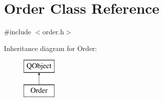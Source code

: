 \hypertarget{class_order}{}\section{Order Class Reference}
\label{class_order}


{\ttfamily \#include $<$order.\+h$>$}

Inheritance diagram for Order\+:\begin{figure}[H]
\begin{center}
\leavevmode
\includegraphics[height=2.000000cm]{class_order}
\end{center}
\end{figure}
